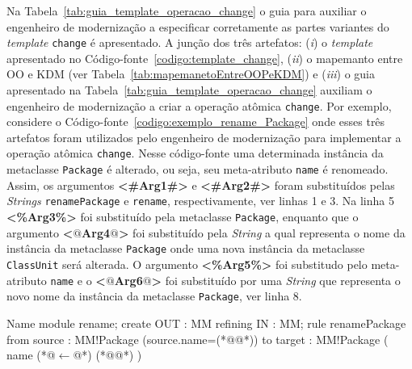 Na Tabela~\ref{tab:guia_template_operacao_change} o guia para auxiliar o engenheiro de modernização a especificar corretamente as partes variantes do \textit{template} \texttt{change} é apresentado. A junção dos três artefatos: (\textit{i}) o \textit{template} apresentado no Código-fonte~\ref{codigo:template_change}, (\textit{ii}) o mapemanto entre OO e KDM (ver Tabela~\ref{tab:mapemanetoEntreOOPeKDM}) e (\textit{iii}) o guia apresentado na Tabela~\ref{tab:guia_template_operacao_change} auxiliam o engenheiro de modernização a criar a operação atômica \texttt{change}. Por exemplo, considere o Código-fonte~\ref{codigo:exemplo_rename_Package} onde esses três artefatos foram utilizados pelo engenheiro de modernização para implementar a operação atômica \texttt{change}. Nesse código-fonte uma determinada instância da metaclasse \texttt{Package} é alterado, ou seja, seu meta-atributo \texttt{name} é renomeado. Assim, os argumentos \textbf{<\#Arg1\#>} e \textbf{<\#Arg2\#>} foram substituídos pelas \textit{Strings} \texttt{renamePackage} e \texttt{rename}, respectivamente, ver linhas 1 e 3. Na linha 5 \textbf{<\%Arg3\%>} foi substituído pela metaclasse \texttt{Package}, enquanto que o argumento \textbf{<$@$Arg4$@$>} foi substituído pela \textit{String} \texttt{} a qual representa o nome da instância da metaclasse \texttt{Package} onde uma nova instância da metaclasse \texttt{ClassUnit} será alterada. O argumento \textbf{<\%Arg5\%>} foi substitudo pelo meta-atributo \texttt{name} e o \textbf{<$@$Arg6$@$>} foi substituído por uma \textit{String} que representa o novo nome da instância da metaclasse \texttt{Package}, ver linha 8.



\begin{codigo}[caption={[ATL para realizar a operação atômica \texttt{change} \texttt{ClassUnit}.] ATL para realizar a operação atômica \texttt{change} \texttt{ClassUnit}.},escapeinside={(*@}{@*)}, basicstyle=\footnotesize, label={codigo:exemplo_rename_Package}, language=ATL]{Name}
module rename;
create OUT : MM refining IN : MM;
rule renamePackage {
	from
		source : MM!Package (source.name=(*@@*))
	to 
		target : MM!Package (
			name (*@$\leftarrow$@*) (*@@*)
		)
}
\end{codigo}


